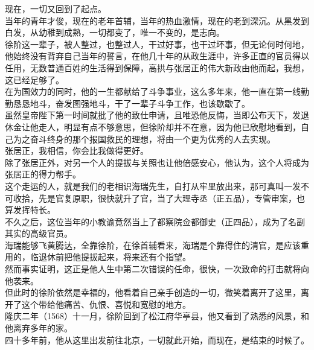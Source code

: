 \begin{multicols}{\theparacolNo}
现在，一切又回到了起点。\\

当年的青年才俊，现在的老年首辅，当年的热血激情，现在的老到深沉。从黑发到白发，从幼稚到成熟，一切都变了，唯一不变的，是志向。\\

徐阶这一辈子，被人整过，也整过人，干过好事，也干过坏事，但无论何时何地，他始终没有背弃自己当年的誓言，在他几十年的从政生涯中，许多正直的官员得以任用，无数普通百姓的生活得到保障，高拱与张居正的伟大新政由他而起，我想，这已经足够了。\\

在为国效力的同时，他的一生都献给了斗争事业，这么多年来，他一直在第一线勤勤恳恳地斗，奋发图强地斗，干了一辈子斗争工作，也该歇歇了。\\

虽然皇帝陛下第一时间就批了他的致仕申请，且唯恐他反悔，当即公布天下，发退休金让他走人，明显有点不够意思，但徐阶却并不在意，因为他已欣慰地看到，自己为之奋斗终身的那个报国救民的理想，将由一个更为优秀的人去实现。\\

张居正，我相信，你会比我做得更好。\\

除了张居正外，对另一个人的提拔与关照也让他倍感安心，他认为，这个人将成为张居正的得力帮手。\\

这个走运的人，就是我们的老相识海瑞先生，自打从牢里放出来，那可真叫一发不可收拾，先是官复原职，很快就升了官，当了大理寺丞（正五品），专管审案，也算发挥特长。\\

不久之后，这位当年的小教谕竟然当上了都察院佥都御史（正四品），成为了名副其实的高级官员。\\

海瑞能够飞黄腾达，全靠徐阶，在徐首辅看来，海瑞是个靠得住的清官，是应该重用的，临退休前把他提拔起来，将来还有个指望。\\

然而事实证明，这正是他人生中第二次错误的任命，很快，一次致命的打击就将向他袭来。\\

但此时的徐阶依然是幸福的，他看着自己亲手创造的一切，微笑着离开了这里，离开了这个带给他痛苦、仇恨、喜悦和宽慰的地方。\\

隆庆二年（1568）十一月，徐阶回到了松江府华亭县，他又看到了熟悉的风景，和他离弃多年的家。\\

四十多年前，他从这里出发前往北京，一切就此开始，而现在，是结束的时候了。\\


\end{multicols}
